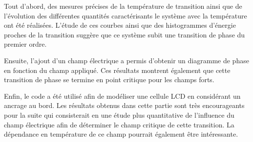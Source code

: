 \documentclass[11pt]{article}
\numberwithin{equation}{section}
\begin{document}
Tout d'abord, des mesures précises de la température de transition ainsi que de l'évolution des différentes quantités caractérisants le système avec la température ont été réalisées. L'étude de ces courbes ainsi que des histogrammes d'énergie proches de la transition suggère que ce système subit une transition de phase du premier ordre.
\medskip

Ensuite, l'ajout d'un champ électrique a permis d'obtenir un diagramme de phase en fonction du champ appliqué. Ces résultats montrent également que cette transition de phase se termine en point critique pour les champs forts.
\medskip

Enfin, le code a été utilisé afin de modéliser une cellule LCD en considérant un ancrage au bord. Les résultats obtenus dans cette partie sont très encourageants pour la suite qui consisterait en une étude plus quantitative de l'influence du champ électrique afin de déterminer le champ critique de cette transition. La dépendance en température de ce champ pourrait également être intéressante.


 
\end{document}
